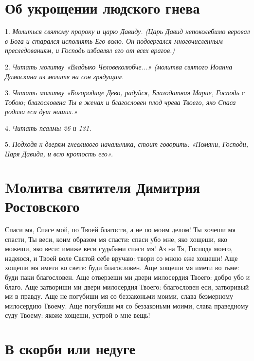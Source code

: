 \section{Об укрощении людского гнева}
 


1. \itshape Молиться святому пророку и царю Давиду. (Царь Давид непоколебимо веровал в Бога и старался исполнять Его волю. Он подвергался многочисленным преследованиям, и Господь избавлял его от всех врагов.)\normalfont{}

2. \itshape Читать молитву\normalfont{} «Владыко Человеколюбче...» (\itshape молитва святого Иоанна Дамаскина из молитв на сон грядущим.\normalfont{}

3. \itshape Читать молитву\normalfont{} «Богородице Дево, радуйся, Благодатная Марие, Господь с Тобою; благословена Ты в женах и благословен плод чрева Твоего, яко Спаса родила еси душ наших.»

4. \itshape Читать псалмы 26 и 131.\normalfont{}

5. \itshape Подходя к дверям гневливого начальника, стоит говорить:\normalfont{} «Помяни, Господи, Царя Давида, и всю кротость его».





\section{Mолитва святителя Димитрия Ростовского}
 


Спаси мя, Спасе мой, по Твоей благости, а не по моим делом! Ты хочеши мя спасти, Ты веси, коим образом мя спасти: спаси убо мне, яко хощеши, яко можеши, яко веси: имиже веси судьбами спаси мя! Аз на Тя, Господа моего, надеюся, и Твоей воле Святой себе вручаю: твори со мною еже хощеши! Аще хощеши мя имети во свете: буди благословен. Аще хощеши мя имети во тьме: буди паки благословен. Аще отверзеши ми двери милосердия Твоего: добро убо и благо. Аще затвориши ми двери милосердия Твоего: благословен еси, затворивый ми в правду. Аще не погубиши мя со беззаконьми моими, слава безмерному милосердию Твоему. Аще погубиши мя со беззаконьми моими, слава праведному суду Твоему: якоже хощеши, устрой о мне вещь!


\section{В скорби или недуге}
 


